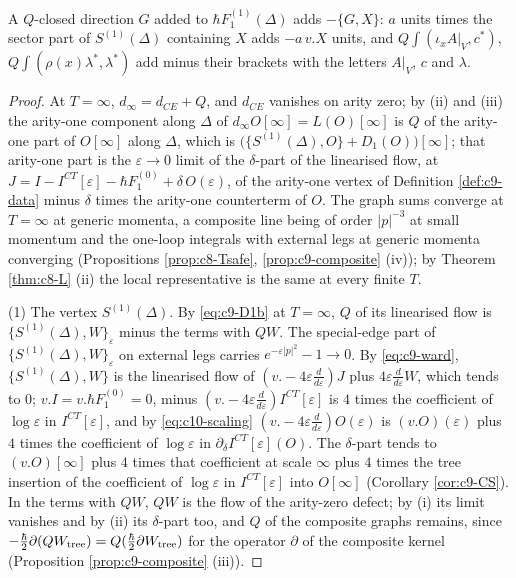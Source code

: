 \begin{theorem}[Decomposition of $D_1$]
A $Q$-closed direction $G$ added to $\hbar F_1^{(1)}(\Delta)$ adds $-\{G,X\}$: $a$ units times the sector part of $S^{(1)}(\Delta)$ containing $X$ adds $-a\,v.X$ units, and $Q\int(\iota_xA|_V,c^*)$, $Q\int(\rho(x)\lambda^*,\lambda^*)$ add minus their brackets with the letters $A|_V$, $c$ and $\lambda$.
\end{theorem}

\begin{proof}
At $T=\infty$, $d_\infty=d_{CE}+Q$, and $d_{CE}$ vanishes on arity zero; by (ii) and (iii) the arity-one component along $\Delta$ of $d_\infty O[\infty]=L(O)[\infty]$ is $Q$ of the arity-one part of $O[\infty]$ along $\Delta$, which is $\big(\{S^{(1)}(\Delta),O\}+D_1(O)\big)[\infty]$; that arity-one part is the $\varepsilon\to0$ limit of the $\delta$-part of the linearised flow, at $J=I-I^{CT}[\varepsilon]-\hbar F_1^{(0)}+\delta\,O(\varepsilon)$, of the arity-one vertex of Definition \ref{def:c9-data} minus $\delta$ times the arity-one counterterm of $O$. The graph sums converge at $T=\infty$ at generic momenta, a composite line being of order $|p|^{-3}$ at small momentum and the one-loop integrals with external legs at generic momenta converging (Propositions \ref{prop:c8-Tsafe}, \ref{prop:c9-composite} (iv)); by Theorem \ref{thm:c8-L} (ii) the local representative is the same at every finite $T$.

(1) The vertex $S^{(1)}(\Delta)$. By \eqref{eq:c9-D1b} at $T=\infty$, $Q$ of its linearised flow is $\{S^{(1)}(\Delta),W\}_\varepsilon$ minus the terms with $QW$. The special-edge part of $\{S^{(1)}(\Delta),W\}_\varepsilon$ on external legs carries $e^{-\varepsilon|p|^2}-1\to0$. By \eqref{eq:c9-ward}, $\{S^{(1)}(\Delta),W\}$ is the linearised flow of $(v.-4\varepsilon\frac d{d\varepsilon})J$ plus $4\varepsilon\frac d{d\varepsilon}W$, which tends to $0$; $v.I=v.\hbar F_1^{(0)}=0$, minus $(v.-4\varepsilon\frac d{d\varepsilon})I^{CT}[\varepsilon]$ is $4$ times the coefficient of $\log\varepsilon$ in $I^{CT}[\varepsilon]$, and by \eqref{eq:c10-scaling} $(v.-4\varepsilon\frac d{d\varepsilon})O(\varepsilon)$ is $(v.O)(\varepsilon)$ plus $4$ times the coefficient of $\log\varepsilon$ in $\partial_\delta I^{CT}[\varepsilon](O)$. The $\delta$-part tends to $(v.O)[\infty]$ plus $4$ times that coefficient at scale $\infty$ plus $4$ times the tree insertion of the coefficient of $\log\varepsilon$ in $I^{CT}[\varepsilon]$ into $O[\infty]$ (Corollary \ref{cor:c9-CS}). In the terms with $QW$, $QW$ is the flow of the arity-zero defect; by (i) its limit vanishes and by (ii) its $\delta$-part too, and $Q$ of the composite graphs remains, since $-\tfrac\hbar2\partial(QW_{\rm tree})=Q(\tfrac\hbar2\partial W_{\rm tree})$ for the operator $\partial$ of the composite kernel (Proposition \ref{prop:c9-composite} (iii)).


\end{proof}
